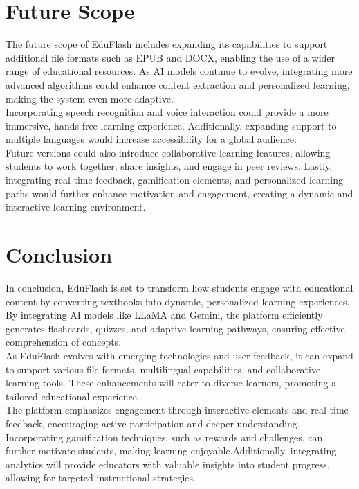 \documentclass{report}
\begin{document}
\chapter{Future Scope}

The future scope of EduFlash includes expanding its capabilities to support additional file formats such as EPUB and DOCX, enabling the use of a wider range of educational resources. As AI models continue to evolve, integrating more advanced algorithms could enhance content extraction and personalized learning, making the system even more adaptive.\\

Incorporating speech recognition and voice interaction could provide a more immersive, hands-free learning experience. Additionally, expanding support to multiple languages would increase accessibility for a global audience.\\

Future versions could also introduce collaborative learning features, allowing students to work together, share insights, and engage in peer reviews. Lastly, integrating real-time feedback, gamification elements, and personalized learning paths would further enhance motivation and engagement, creating a dynamic and interactive learning environment.

\chapter{Conclusion}

In conclusion, EduFlash is set to transform how students engage with educational content by converting textbooks into dynamic, personalized learning experiences. By integrating AI models like LLaMA and Gemini, the platform efficiently generates flashcards, quizzes, and adaptive learning pathways, ensuring effective comprehension of concepts.\\

As EduFlash evolves with emerging technologies and user feedback, it can expand to support various file formats, multilingual capabilities, and collaborative learning tools. These enhancements will cater to diverse learners, promoting a tailored educational experience.\\

The platform emphasizes engagement through interactive elements and real-time feedback, encouraging active participation and deeper understanding. Incorporating gamification techniques, such as rewards and challenges, can further motivate students, making learning enjoyable.Additionally, integrating analytics will provide educators with valuable insights into student progress, allowing for targeted instructional strategies.\\
\end{document}
